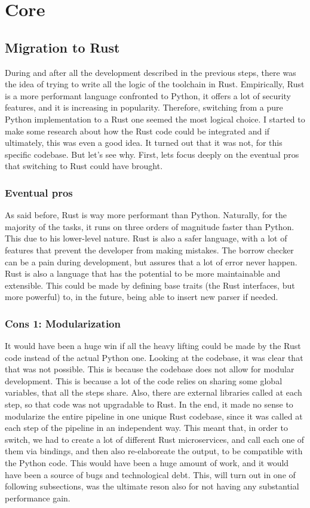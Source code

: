 \chapter{Core}
\label{cha:core}

\section{Migration to Rust}
\label{cha:Migration to Rust} During and after all the development described in
the previous steps, there was the idea of trying to write all the logic of the toolchain
in Rust. Empirically, Rust is a more performant language confronted to Python,
it offers a lot of security features, and it is increasing in popularity.
Therefore, switching from a pure Python implementation to a Rust one seemed the most
logical choice. I started to make some research about how the Rust code could be
integrated and if ultimately, this was even a good idea. It turned out that it
was not, for this specific codebase. But let's see why. First, lets focus deeply
on the eventual pros that switching to Rust could have brought.

\subsection[short]{Eventual pros}
As said before, Rust is way more performant than Python. Naturally, for the majority
of the tasks, it runs on three orders of magnitude faster than Python. This due to
his lower-level nature. Rust is also a safer language, with a lot of features that
prevent the developer from making mistakes. The borrow checker can be a pain
during development, but assures that a lot of error never happen. Rust is also a
language that has the potential to be more maintainable and extensible. This could
be made by defining base traits (the Rust interfaces, but more powerful) to, in the
future, being able to insert new parser if needed.

\subsection[short]{Cons 1: Modularization}
It would have been a huge win if all the heavy lifting could be made by the Rust
code instead of the actual Python one. Looking at the codebase, it was clear
that that was not possible. This is because the codebase does not allow for modular
development. This is because a lot of the code relies on sharing some global
variables, that all the steps share. Also, there are external libraries called at
each step, so that code was not upgradable to Rust. In the end, it made no sense
to modularize the entire pipeline in one unique Rust codebase, since it was called
at each step of the pipeline in an independent way. This meant that, in order to
switch, we had to create a lot of different Rust microservices, and call each one
of them via bindings, and then also re-elaboreate the output, to be compatible with
the Python code. This would have been a huge amount of work, and it would have been
a source of bugs and technological debt. This, will turn out in one of following
subsections, was the ultimate reson also for not having any substantial
performance gain.

